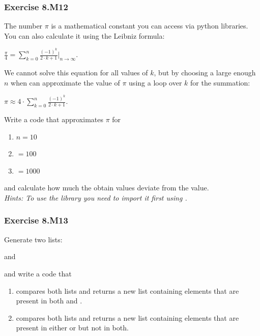 \subsubsection*{Exercise 8.M12 \red{[M]}}
The number $\pi$ is a mathematical constant you can access via python libraries. You can also
calculate it using the Leibniz formula:\\
\begin{center}
	$\frac{\pi}{4} = \sum_{k=0}^{n} \frac{(-1)^k}{2\cdot k+1}|_{n\rightarrow \infty}$.
\end{center}
We cannot solve this equation for all values of $k$, but by choosing a large enough $n$ when can approximate the value of $\pi$ using a loop over $k$ for the summation:
\begin{center}
	$\pi \approx 4 \cdot \sum_{k=0}^{n} \frac{(-1)^k}{2\cdot k+1}$.
\end{center}
Write a code that approximates $\pi$ for
\begin{enumerate}[label=(\alph*)]
	\item $n = 10$
	\item $ = 100$
	\item $ = 1000$
\end{enumerate}
and calculate how much the obtain values deviate from the {} value.\\


\textit{Hints:
To use the {} library you need to import it first using {}.}\\[1cm]



\subsubsection*{Exercise 8.M13}
Generate two lists:
\begin{center}
	{}
\end{center}
and
\begin{center}
	{}
\end{center}
and write a code that
\begin{enumerate}[label=(\alph*)]
	\item compares both lists and returns a new list containing elements that are present in
both {} and {}.
	\item  compares both lists and returns a new list containing elements that are present in
either {} or {} but not in both.
\end{enumerate}

